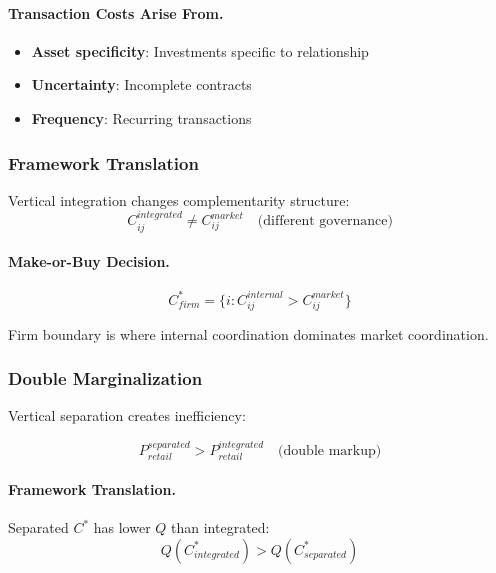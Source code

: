 \paragraph{Transaction Costs Arise From.}
\begin{itemize}
    \item \textbf{Asset specificity}: Investments specific to relationship
    \item \textbf{Uncertainty}: Incomplete contracts
    \item \textbf{Frequency}: Recurring transactions
\end{itemize}

\subsubsection{Framework Translation}

Vertical integration changes complementarity structure:
\begin{equation}
C_{ij}^{integrated} \neq C_{ij}^{market} \quad \text{(different governance)}
\end{equation}

\paragraph{Make-or-Buy Decision.}
\begin{equation}
C^*_{firm} = \{i : C_{ij}^{internal} > C_{ij}^{market}\}
\end{equation}

Firm boundary is where internal coordination dominates market coordination.

\subsubsection{Double Marginalization}

Vertical separation creates inefficiency:

\begin{equation}
\boxed{
P_{retail}^{separated} > P_{retail}^{integrated} \quad \text{(double markup)}
}
\label{eq:double-margin}
\end{equation}

\paragraph{Framework Translation.}
Separated $C^*$ has lower $Q$ than integrated:
\begin{equation}
Q(C^*_{integrated}) > Q(C^*_{separated})
\end{equation}

